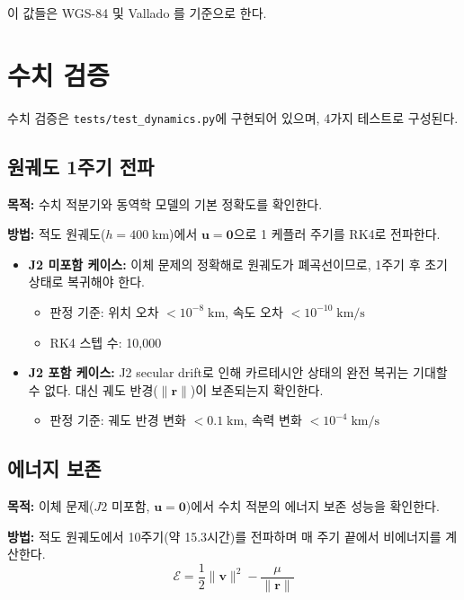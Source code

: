 \documentclass[11pt]{article}
\begin{document}
이 값들은 WGS-84 및 Vallado \cite{Vallado2013}를 기준으로 한다.


\section{수치 검증}
\label{sec:verification}

수치 검증은 \texttt{tests/test\_dynamics.py}에 구현되어 있으며, 4가지 테스트로 구성된다.

\subsection{원궤도 1주기 전파}

\textbf{목적:} 수치 적분기와 동역학 모델의 기본 정확도를 확인한다.

\textbf{방법:} 적도 원궤도($h = 400\;\text{km}$)에서 $\mathbf{u} = \mathbf{0}$으로 1 케플러 주기를 RK4로 전파한다.

\begin{itemize}
  \item \textbf{J2 미포함 케이스:} 이체 문제의 정확해로 원궤도가 폐곡선이므로, 1주기 후 초기 상태로 복귀해야 한다.
  \begin{itemize}
    \item 판정 기준: 위치 오차 $< 10^{-8}\;\text{km}$, 속도 오차 $< 10^{-10}\;\text{km/s}$
    \item RK4 스텝 수: 10,000
  \end{itemize}
  \item \textbf{J2 포함 케이스:} J2 secular drift로 인해 카르테시안 상태의 완전 복귀는 기대할 수 없다. 대신 궤도 반경($\|\mathbf{r}\|$)이 보존되는지 확인한다.
  \begin{itemize}
    \item 판정 기준: 궤도 반경 변화 $< 0.1\;\text{km}$, 속력 변화 $< 10^{-4}\;\text{km/s}$
  \end{itemize}
\end{itemize}

\subsection{에너지 보존}

\textbf{목적:} 이체 문제($J2$ 미포함, $\mathbf{u} = \mathbf{0}$)에서 수치 적분의 에너지 보존 성능을 확인한다.

\textbf{방법:} 적도 원궤도에서 10주기(약 15.3시간)를 전파하며 매 주기 끝에서 비에너지를 계산한다.
\[
\mathcal{E} = \frac{1}{2}\|\mathbf{v}\|^2 - \frac{\mu}{\|\mathbf{r}\|}
\]
\end{document}
